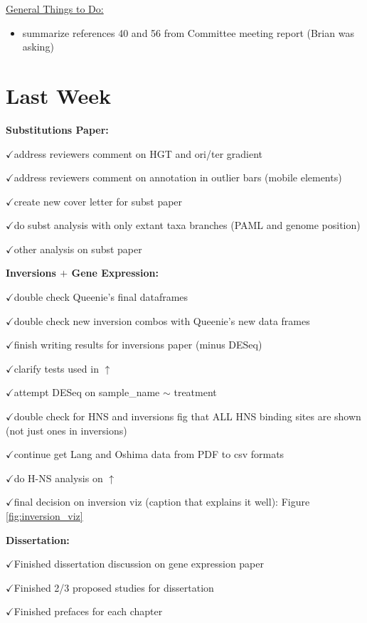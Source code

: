 \documentclass[12pt]{article}
\newcommand{\ch}{$\checkmark$}
\begin{document}
\underline{General Things to Do:}
\begin{itemize}
	\item summarize references 40 and 56 from Committee meeting report (Brian was asking)
	
	
\end{itemize}

\section*{Last Week}



\textbf{Substitutions Paper:}

\ch address reviewers comment on HGT and ori/ter gradient

\ch address reviewers comment on annotation in outlier bars (mobile elements)

\ch create new cover letter for subst paper

\ch do subst analysis with only extant taxa branches (PAML and genome position)

\ch other analysis on subst paper

\textbf{Inversions $+$ Gene Expression:}

\ch double check Queenie's final dataframes 

\ch double check new inversion combos with Queenie's new data frames

\ch finish writing results for inversions paper (minus DESeq)

\ch clarify tests used in $\uparrow$

\ch attempt DESeq on sample\_name $\sim$ treatment

\ch double check for HNS and inversions fig that ALL HNS binding sites are shown (not just ones in inversions)

\ch continue get Lang and Oshima data from PDF to csv formats

\ch do H-NS analysis on $\uparrow$

\ch final decision on inversion viz (caption that explains it well): Figure \ref{fig:inversion_viz}


\textbf{Dissertation:}

\ch Finished dissertation discussion on gene expression paper

\ch Finished 2/3 proposed studies for dissertation

\ch Finished prefaces for each chapter

\bigskip
\end{document}

